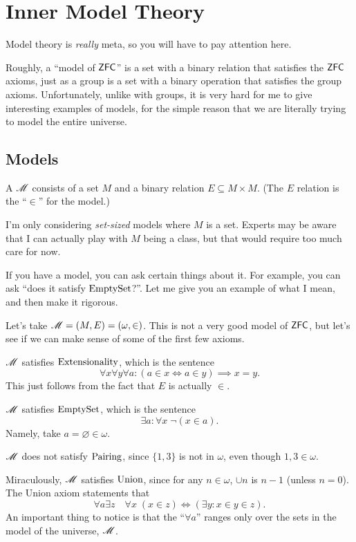 \chapter{Inner Model Theory}
Model theory is \emph{really} meta, so you will have to pay attention here.

Roughly, a ``model of $\mathsf{ZFC}$'' is a set with a binary relation that satisfies the $\mathsf{ZFC}$ axioms,
just as a group is a set with a binary operation that satisfies the group axioms.
Unfortunately, unlike with groups, it is very hard for me to give interesting examples of models,
for the simple reason that we are literally trying to model the entire universe.

\section{Models}
\begin{definition}
	A  $\mathscr M$ consists of a set $M$ and a
	binary relation $E \subseteq M \times M$.
	(The $E$ relation is the ``$\in$'' for the model.)
\end{definition}
\begin{remark}
	I'm only considering \emph{set-sized} models where $M$ is a set.
	Experts may be aware that I can actually play with $M$ being a class,
	but that would require too much care for now.
\end{remark}
If you have a model, you can ask certain things about it.
For example, you can ask ``does it satisfy $\mathrm{EmptySet}$?''.
Let me give you an example of what I mean, and then make it rigorous.
\begin{example}
	Let's take $\mathscr M = (M,E) = \left( \omega, \in \right)$.
	This is not a very good model of $\mathsf{ZFC}$, but let's see if we can
	make sense of some of the first few axioms.
	\begin{enumerate}[(a)]
		\ii $\mathscr M$ satisfies $\mathrm{Extensionality}$, which is the sentence
		\[ \forall x \forall y \forall a : \left( a \in x \iff a \in y \right) \implies x = y. \]
		This just follows from the fact that $E$ is actually $\in$.

		\ii $\mathscr M$ satisfies $\mathrm{EmptySet}$, which is the sentence
		\[ \exists a : \forall x \; \neg (x \in a). \]
		Namely, take $a = \varnothing \in \omega$.

		\ii $\mathscr M$ does not satisfy $\mathrm{Pairing}$, since $\{1,3\}$ is not in $\omega$,
		even though $1, 3 \in \omega$.

		\ii Miraculously, $\mathscr M$ satisfies $\mathrm{Union}$, since for any $n \in \omega$,
		$\cup n$ is $n-1$ (unless $n=0$).
		The Union axiom statements that
		\[ \forall a \exists z \quad \forall x \; (x \in z) \iff (\exists y : x \in y \in z). \]
		An important thing to notice is that the ``$\forall a$'' ranges only over
		the sets in the model of the universe, $\mathscr M$.
	\end{enumerate}
\end{example}
